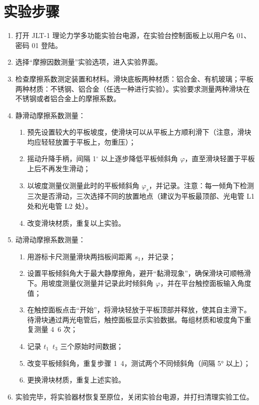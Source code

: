     
\section{实验步骤}

\begin{enumerate}
    \item 打开 JLT-1 理论力学多功能实验台电源，在实验台控制面板上以用户名 01、密码 01 登陆。 
    \item 选择“摩擦因数测量”实验选项，进入实验界面。
    \item 检查摩擦系数测定装置和材料。滑块底板两种材质：铝合金、有机玻璃；平板两种材质：不锈钢、铝合金（任选一种进行实验）。实验要求测量两种滑块在不锈钢或者铝合金上的摩擦系数。
    \item 静滑动摩擦系数测量：
        \begin{enumerate}
            \item 预先设置较大的平板坡度，使滑块可以从平板上方顺利滑下（注意，滑块均应轻轻放置于平板上，勿重压）；
            \item 摇动升降手柄，间隔 1$^\circ$ 以上逐步降低平板倾斜角 $\varphi$，直至滑块轻置于平板上后不再发生滑动；
            \item 以坡度测量仪测量此时的平板倾斜角 $\varphi_s$，并记录。注意：每一倾角下检测三次是否滑动，三次选择不同的放置地点（建议为平板最顶部、光电管 L1 处和光电管 L2 处）。
            \item 改变滑块材质，重复以上实验。
        \end{enumerate}
    \item 动滑动摩擦系数测量：
        \begin{enumerate}
            \item 用游标卡尺测量滑块两挡板间距离 $s_1$，并记录；
            \item 设置平板倾斜角大于最大静摩擦角，避开“黏滑现象”，确保滑块可顺畅滑下。用坡度测量仪测量并记录此时倾斜角 $\varphi$，并在平台触控面板输入角度值；
            \item 在触控面板点击“开始”，将滑块轻放于平板顶部并释放，使其自主滑下。待滑块通过两光电管后，触控面板显示实验数据。每组材质和坡度角下重复测量 4~6 次；
            \item 记录 $t_1$~$t_3$ 三个原始时间数据；
            \item 改变平板倾斜角，重复步骤 1~4，测试两个不同倾斜角（间隔 5° 以上）；
            \item 更换滑块材质，重复上述实验。
        \end{enumerate}
    \item 实验完毕，将实验器材恢复至原位，关闭实验台电源，并打扫清理实验工位。
\end{enumerate}

